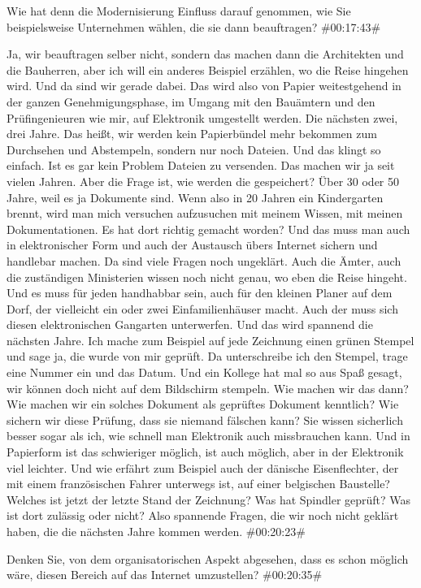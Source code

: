 \begin{description}
\Toni Wie hat denn die Modernisierung Einfluss darauf genommen, wie Sie beispielsweise Unternehmen wählen, die sie dann beauftragen? \#00:17:43\#

\Andre Ja, wir beauftragen selber nicht, sondern das machen dann die Architekten und die Bauherren, aber ich will ein anderes Beispiel erzählen, wo die Reise hingehen wird. Und da sind wir gerade dabei. Das wird also von Papier weitestgehend in der ganzen Genehmigungsphase, im Umgang mit den Bauämtern und den Prüfingenieuren wie mir, auf Elektronik umgestellt werden. Die nächsten zwei, drei Jahre. Das heißt, wir werden kein Papierbündel mehr bekommen zum Durchsehen und Abstempeln, sondern nur noch Dateien. Und das klingt so einfach. Ist es gar kein Problem Dateien zu versenden. Das machen wir ja seit vielen Jahren. Aber die Frage ist, wie werden die gespeichert? Über 30 oder 50 Jahre, weil es ja Dokumente sind. Wenn also in 20 Jahren ein Kindergarten brennt, wird man mich versuchen aufzusuchen mit meinem Wissen, mit meinen Dokumentationen. Es hat dort richtig gemacht worden? Und das muss man auch in elektronischer Form und auch der Austausch übers Internet sichern und handlebar machen. Da sind viele Fragen noch ungeklärt. Auch die Ämter, auch die zuständigen Ministerien wissen noch nicht genau, wo eben die Reise hingeht. Und es muss für jeden handhabbar sein, auch für den kleinen Planer auf dem Dorf, der vielleicht ein oder zwei Einfamilienhäuser macht. Auch der muss sich diesen elektronischen Gangarten unterwerfen. Und das wird spannend die nächsten Jahre. Ich mache zum Beispiel auf jede Zeichnung einen grünen Stempel und sage ja, die wurde von mir geprüft. Da unterschreibe ich den Stempel, trage eine Nummer ein und das Datum. Und ein Kollege hat mal so aus Spaß gesagt, wir können doch nicht auf dem Bildschirm stempeln. Wie machen wir das dann? Wie machen wir ein solches Dokument als geprüftes Dokument kenntlich? Wie sichern wir diese Prüfung, dass sie niemand fälschen kann? Sie wissen sicherlich besser sogar als ich, wie schnell man Elektronik auch missbrauchen kann. Und in Papierform ist das schwieriger möglich, ist auch möglich, aber in der Elektronik viel leichter. Und wie erfährt zum Beispiel auch der dänische Eisenflechter, der mit einem französischen Fahrer unterwegs ist, auf einer belgischen Baustelle? Welches ist jetzt der letzte Stand der Zeichnung? Was hat Spindler geprüft? Was ist dort zulässig oder nicht? Also spannende Fragen, die wir noch nicht geklärt haben, die die nächsten Jahre kommen werden. \#00:20:23\#

\Fabian Denken Sie, von dem organisatorischen Aspekt abgesehen, dass es schon möglich wäre, diesen Bereich auf das Internet umzustellen? \#00:20:35\#


\end{description}
